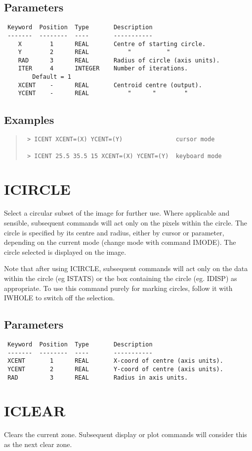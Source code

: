 \documentclass{book}
\renewcommand{\_}{{\tt\char'137}}     %
\begin{document}
\subsection{Parameters}
\begin{verbatim}
 Keyword  Position  Type       Description
 -------  --------  ----       -----------
    X        1      REAL       Centre of starting circle.
    Y        2      REAL           "          "
    RAD      3      REAL       Radius of circle (axis units).
    ITER     4      INTEGER    Number of iterations.
        Default = 1
    XCENT    -      REAL       Centroid centre (output).
    YCENT    -      REAL           "      "        "

\end{verbatim}\subsection{Examples}
\begin{quote}\begin{verbatim}
 > ICENT XCENT=(X) YCENT=(Y)               cursor mode

 > ICENT 25.5 35.5 15 XCENT=(X) YCENT=(Y)  keyboard mode
\end{verbatim}\end{quote}
\section{ICIRCLE}
Select a circular subset of the image for further use. Where
applicable and sensible, subsequent commands will act only on the
pixels within the circle. The circle is specified by its centre and
radius, either by cursor or parameter, depending on the current mode
(change mode with command IMODE). The circle selected is displayed
on the image.

Note that after using ICIRCLE, subsequent commands will act only
on the data within the circle (eg ISTATS) or the box containing
the circle (eg. IDISP) as appropriate. To use this command
purely for marking circles, follow it with IWHOLE to switch off
the selection.

\subsection{Parameters}
\begin{verbatim}
 Keyword  Position  Type       Description
 -------  --------  ----       -----------
 XCENT       1      REAL       X-coord of centre (axis units).
 YCENT       2      REAL       Y-coord of centre (axis units).
 RAD         3      REAL       Radius in axis units.

\end{verbatim}\section{ICLEAR}
Clears the current zone. Subsequent display or plot commands will
consider this as the next clear zone.
\end{document}
